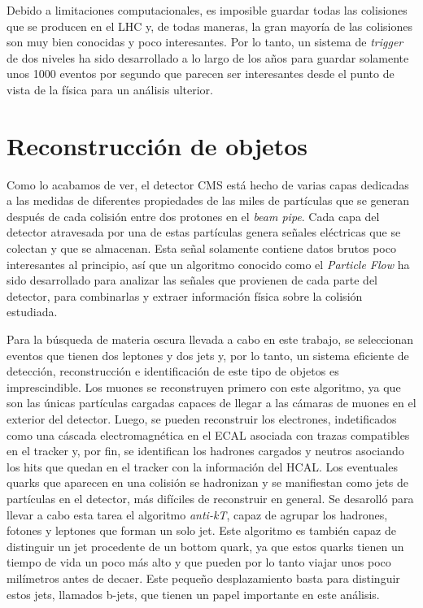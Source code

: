 \documentclass[a4paper, 10pt, openright]{report}
\begin{document}
\begin{appendices}
Debido a limitaciones computacionales, es imposible guardar todas las colisiones que se producen en el \ac{LHC} y, de todas maneras, la gran mayor\'{i}a de las colisiones son muy bien conocidas y poco interesantes. Por lo tanto, un sistema de \textit{trigger} de dos niveles ha sido desarrollado a lo largo de los a\~{n}os para guardar solamente unos 1000 eventos por segundo que parecen ser interesantes desde el punto de vista de la f\'{i}sica para un an\'{a}lisis ulterior.

\section{Reconstrucci\'{o}n de objetos}

Como lo acabamos de ver, el detector \ac{CMS} est\'{a} hecho de varias capas dedicadas a las medidas de diferentes propiedades de las miles de part\'{i}culas que se generan despu\'{e}s de cada colisi\'{o}n entre dos protones en el \textit{beam pipe}. Cada capa del detector atravesada por una de estas part\'{i}culas genera se\~{n}ales el\'{e}ctricas que se colectan y que se almacenan. Esta se\~{n}al solamente contiene datos brutos poco interesantes al principio, as\'{i} que un algoritmo conocido como el \textit{Particle Flow} ha sido desarrollado para analizar las se\~{n}ales que provienen de cada parte del detector, para combinarlas y extraer informaci\'{o}n f\'{i}sica sobre la colisi\'{o}n estudiada.

Para la b\'{u}squeda de materia oscura llevada a cabo en este trabajo, se seleccionan eventos que tienen dos leptones y dos jets y, por lo tanto, un sistema eficiente de detecci\'{o}n, reconstrucci\'{o}n e identificaci\'{o}n de este tipo de objetos es imprescindible. Los muones se reconstruyen primero con este algoritmo, ya que son las \'{u}nicas part\'{i}culas cargadas capaces de llegar a las c\'{a}maras de muones en el exterior del detector. Luego, se pueden reconstruir los electrones, indetificados como una c\'{a}scada electromagn\'{e}tica en el \ac{ECAL} asociada con trazas compatibles en el tracker y, por fin, se identifican los hadrones cargados y neutros asociando los hits que quedan en el tracker con la informaci\'{o}n del \ac{HCAL}. Los eventuales quarks que aparecen en una colisi\'{o}n se hadronizan y se manifiestan como jets de part\'{i}culas en el detector, m\'{a}s dif\'{i}ciles de reconstruir en general. Se desaroll\'{o} para llevar a cabo esta tarea el algoritmo \textit{anti-kT}, capaz de agrupar los hadrones, fotones y leptones que forman un solo jet. Este algoritmo es tambi\'{e}n capaz de distinguir un jet procedente de un bottom quark, ya que estos quarks tienen un tiempo de vida un poco m\'{a}s alto y que pueden por lo tanto viajar unos poco mil\'{i}metros antes de decaer. Este peque\~{n}o desplazamiento basta para distinguir estos jets, llamados b-jets, que tienen un papel importante en este an\'{a}lisis. 


\end{appendices}
\end{document}

